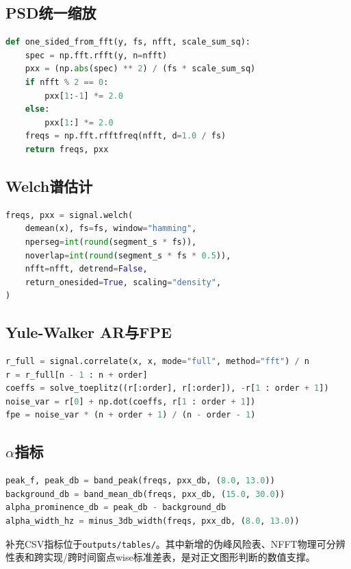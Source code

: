 \documentclass[UTF8,zihao=-4,fontset=windows]{ctexart}
\begin{document}
\subsection{PSD统一缩放}
\begin{lstlisting}[language=Python]
def one_sided_from_fft(y, fs, nfft, scale_sum_sq):
    spec = np.fft.rfft(y, n=nfft)
    pxx = (np.abs(spec) ** 2) / (fs * scale_sum_sq)
    if nfft % 2 == 0:
        pxx[1:-1] *= 2.0
    else:
        pxx[1:] *= 2.0
    freqs = np.fft.rfftfreq(nfft, d=1.0 / fs)
    return freqs, pxx
\end{lstlisting}

\subsection{Welch谱估计}
\begin{lstlisting}[language=Python]
freqs, pxx = signal.welch(
    demean(x), fs=fs, window="hamming",
    nperseg=int(round(segment_s * fs)),
    noverlap=int(round(segment_s * fs * 0.5)),
    nfft=nfft, detrend=False,
    return_onesided=True, scaling="density",
)
\end{lstlisting}

\subsection{Yule-Walker AR与FPE}
\begin{lstlisting}[language=Python]
r_full = signal.correlate(x, x, mode="full", method="fft") / n
r = r_full[n - 1 : n + order]
coeffs = solve_toeplitz((r[:order], r[:order]), -r[1 : order + 1])
noise_var = r[0] + np.dot(coeffs, r[1 : order + 1])
fpe = noise_var * (n + order + 1) / (n - order - 1)
\end{lstlisting}

\subsection{\texorpdfstring{$\alpha$}{alpha}指标}
\begin{lstlisting}[language=Python]
peak_f, peak_db = band_peak(freqs, pxx_db, (8.0, 13.0))
background_db = band_mean_db(freqs, pxx_db, (15.0, 30.0))
alpha_prominence_db = peak_db - background_db
alpha_width_hz = minus_3db_width(freqs, pxx_db, (8.0, 13.0))
\end{lstlisting}

补充CSV指标位于\texttt{outputs/tables/}。其中新增的伪峰风险表、NFFT物理可分辨性表和跨实现/跨时间窗点wise标准差表，是对正文图形判断的数值支撑。
\end{document}
